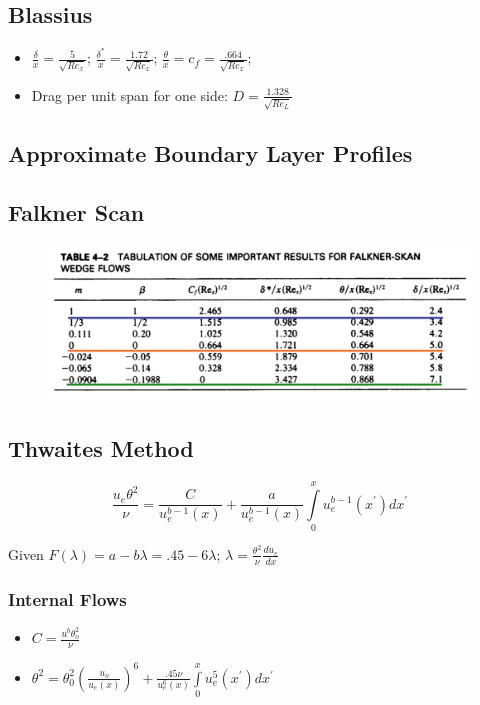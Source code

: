 \documentclass[a4paper]{article}
\begin{document}
    \subsection{Blassius}
        \begin{itemize}
            \item $\frac{\delta}{x} = \frac{5}{\sqrt{Re_x}}$;  $\frac{\delta^*}{x} = \frac{1.72}{\sqrt{Re_x}}$; %
            $\frac{\theta}{x} = c_f = \frac{.664}{\sqrt{Re_x}}$; 
            \item Drag per unit span for one side: $D = \frac{1.328}{\sqrt{Re_L}}$
        \end{itemize}
    \subsection{Approximate Boundary Layer Profiles}
    \subsection{Falkner Scan}
    \begin{figure}[H]
        \includegraphics[width=.95\textwidth]{images/falkner_skan_table.png}
    \end{figure}
    \subsection{Thwaites Method}
    \begin{equation*}
        \frac{u_e \theta^2}{\nu} = \frac{C}{u_e^{b-1} (x)} + \frac{a}{u_e^{b-1} (x)} \int\limits_0^x u_e^{b-1}(x^\prime) dx^\prime
    \end{equation*}

    Given $F(\lambda) = a - b \lambda = .45 - 6 \lambda$; $\lambda = \frac{\theta^2}{\nu} \frac{du_e}{dx}$

    \subsubsection{Internal Flows}
        \begin{itemize}
            \item $C = \frac{u^b\theta_o^2}{\nu}$
            \item $\theta^2  = \theta_0^2 \left( \frac{u_o}{u_e(x)} \right)^6 + \frac{.45 \nu}{u_e^6(x)} \int\limits_0^x u_e^5(x^\prime) dx^\prime$
        \end{itemize}
\end{document}
